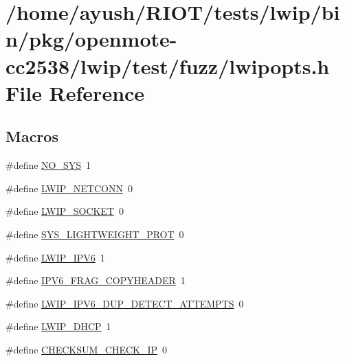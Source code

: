 \hypertarget{openmote-cc2538_2lwip_2test_2fuzz_2lwipopts_8h}{}\section{/home/ayush/\+R\+I\+O\+T/tests/lwip/bin/pkg/openmote-\/cc2538/lwip/test/fuzz/lwipopts.h File Reference}
\label{openmote-cc2538_2lwip_2test_2fuzz_2lwipopts_8h}
\subsection*{Macros}
\begin{DoxyCompactItemize}
\item 
\#define \hyperlink{openmote-cc2538_2lwip_2test_2fuzz_2lwipopts_8h_ae00ba99de94a5bf84d832be8976df59b}{N\+O\+\_\+\+S\+YS}~1
\item 
\#define \hyperlink{openmote-cc2538_2lwip_2test_2fuzz_2lwipopts_8h_a478041b8544461258f6961bf0f3c1a77}{L\+W\+I\+P\+\_\+\+N\+E\+T\+C\+O\+NN}~0
\item 
\#define \hyperlink{openmote-cc2538_2lwip_2test_2fuzz_2lwipopts_8h_a1cb62ce61ac39d7d6728ae5d3d3b927f}{L\+W\+I\+P\+\_\+\+S\+O\+C\+K\+ET}~0
\item 
\#define \hyperlink{openmote-cc2538_2lwip_2test_2fuzz_2lwipopts_8h_ae85efb3a5fcf8585c94b3c2669978959}{S\+Y\+S\+\_\+\+L\+I\+G\+H\+T\+W\+E\+I\+G\+H\+T\+\_\+\+P\+R\+OT}~0
\item 
\#define \hyperlink{openmote-cc2538_2lwip_2test_2fuzz_2lwipopts_8h_a872e3bb3fe2212156d66b18fccc9643f}{L\+W\+I\+P\+\_\+\+I\+P\+V6}~1
\item 
\#define \hyperlink{openmote-cc2538_2lwip_2test_2fuzz_2lwipopts_8h_a151e742cf7f0e5c3a08f31db0370cea7}{I\+P\+V6\+\_\+\+F\+R\+A\+G\+\_\+\+C\+O\+P\+Y\+H\+E\+A\+D\+ER}~1
\item 
\#define \hyperlink{openmote-cc2538_2lwip_2test_2fuzz_2lwipopts_8h_ad8489522d34f37e42b4001bab3781bcb}{L\+W\+I\+P\+\_\+\+I\+P\+V6\+\_\+\+D\+U\+P\+\_\+\+D\+E\+T\+E\+C\+T\+\_\+\+A\+T\+T\+E\+M\+P\+TS}~0
\item 
\#define \hyperlink{openmote-cc2538_2lwip_2test_2fuzz_2lwipopts_8h_a8a6ec62dc121064ac591b1fd8567bee9}{L\+W\+I\+P\+\_\+\+D\+H\+CP}~1
\item 
\#define \hyperlink{openmote-cc2538_2lwip_2test_2fuzz_2lwipopts_8h_a005b1b9988b84a2cb844144cef22c11e}{C\+H\+E\+C\+K\+S\+U\+M\+\_\+\+C\+H\+E\+C\+K\+\_\+\+IP}~0

\end{DoxyCompactItemize}
